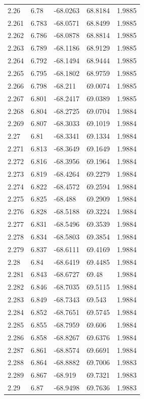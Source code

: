 \begin{tabular}{lllll}
2.26 & 6.78 & -68.0263 & 68.8184 & 1.9885 \\
2.261 & 6.783 & -68.0571 & 68.8499 & 1.9885 \\
2.262 & 6.786 & -68.0878 & 68.8814 & 1.9885 \\
2.263 & 6.789 & -68.1186 & 68.9129 & 1.9885 \\
2.264 & 6.792 & -68.1494 & 68.9444 & 1.9885 \\
2.265 & 6.795 & -68.1802 & 68.9759 & 1.9885 \\
2.266 & 6.798 & -68.211 & 69.0074 & 1.9885 \\
2.267 & 6.801 & -68.2417 & 69.0389 & 1.9885 \\
2.268 & 6.804 & -68.2725 & 69.0704 & 1.9884 \\
2.269 & 6.807 & -68.3033 & 69.1019 & 1.9884 \\
2.27 & 6.81 & -68.3341 & 69.1334 & 1.9884 \\
2.271 & 6.813 & -68.3649 & 69.1649 & 1.9884 \\
2.272 & 6.816 & -68.3956 & 69.1964 & 1.9884 \\
2.273 & 6.819 & -68.4264 & 69.2279 & 1.9884 \\
2.274 & 6.822 & -68.4572 & 69.2594 & 1.9884 \\
2.275 & 6.825 & -68.488 & 69.2909 & 1.9884 \\
2.276 & 6.828 & -68.5188 & 69.3224 & 1.9884 \\
2.277 & 6.831 & -68.5496 & 69.3539 & 1.9884 \\
2.278 & 6.834 & -68.5803 & 69.3854 & 1.9884 \\
2.279 & 6.837 & -68.6111 & 69.4169 & 1.9884 \\
2.28 & 6.84 & -68.6419 & 69.4485 & 1.9884 \\
2.281 & 6.843 & -68.6727 & 69.48 & 1.9884 \\
2.282 & 6.846 & -68.7035 & 69.5115 & 1.9884 \\
2.283 & 6.849 & -68.7343 & 69.543 & 1.9884 \\
2.284 & 6.852 & -68.7651 & 69.5745 & 1.9884 \\
2.285 & 6.855 & -68.7959 & 69.606 & 1.9884 \\
2.286 & 6.858 & -68.8267 & 69.6376 & 1.9884 \\
2.287 & 6.861 & -68.8574 & 69.6691 & 1.9884 \\
2.288 & 6.864 & -68.8882 & 69.7006 & 1.9883 \\
2.289 & 6.867 & -68.919 & 69.7321 & 1.9883 \\
2.29 & 6.87 & -68.9498 & 69.7636 & 1.9883 \\

\end{tabular}
